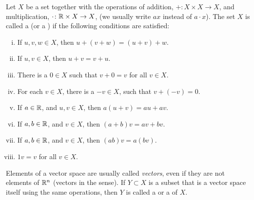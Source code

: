 \begin{defn}
Let $X$ be a set together with
the operations of addition, $+ \colon X \times X \to X$,
and multiplication, $\cdot \colon {\mathbb{R}} \times X \to X$,
(we usually write $ax$ instead of $a \cdot x$).
The set $X$ is called a \emph{}
(or a \emph{})
if the following conditions are satisfied:
\begin{enumerate}[(i)]
\item
If $u, v, w \in X$, then $u+(v+w) = (u+v)+w$.
\item
If $u, v \in X$, then $u+v = v+u$.
\item \label{vecspacedefn:addidentity}
There is a $0 \in X$ such that $v+0=v$ for all $v \in X$.
\item \label{vecspacedefn:addinverse}
For each $v \in X$, there is a $-v \in X$,
such that $v+(-v)=0$.
\item
If $a \in {\mathbb{R}}$, and $u,v \in X$, then
$a(u+v) = au+av$.
\item
If $a,b \in {\mathbb{R}}$, and $v \in X$, then
$(a+b)v = av+bv$.
\item
If $a,b \in {\mathbb{R}}$, and $v \in X$, then
$(ab)v = a(bv)$.
\item
$1v = v$ for all $v \in X$.
\end{enumerate}
Elements of a vector space are usually called \emph{vectors},
even if they
are not elements of ${\mathbb{R}}^n$ (vectors in the  sense).
%
If $Y \subset X$ is a subset that is a vector space itself using the same
operations, then $Y$ is called a \emph{} or
a \emph{} of $X$.
\end{defn}

